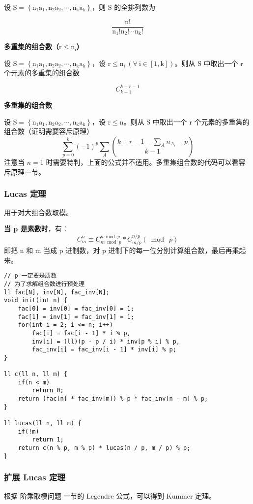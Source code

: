 \documentclass[UTF8]{article}
\begin{document}
设 $\mathrm{S = \left\{n_1a_1, n_2a_2, \cdots, n_ka_k\right\}}$，则 $\mathrm{S}$ 的全排列数为 

$$
\mathrm{\frac{n!}{n_1!n_2!\cdots n_k!}}
$$

\textbf{多重集的组合数（$\mathrm{r \le n_i}$）}

设 $\mathrm{S = \left\{ n_1a_1, n_2a_2, \cdots, n_ka_k \right\}}$，设 $\mathrm{r \le n_i \  (\forall \  i \in [1, k])}$。则从 $\mathrm{S}$ 中取出一个 $\mathrm{r}$ 个元素的多重集的组合数

$$
C^{k + r - 1}_{k - 1}
$$


\textbf{多重集的组合数}

设 $\mathrm{S = \left\{ n_1a_1, n_2a_2, \cdots, n_ka_k \right\}}$，设 $\mathrm{r \le n}$。则从 $\mathrm{S}$ 中取出一个 $\mathrm{r}$ 个元素的多重集的组合数（证明需要容斥原理）
$$
\sum_{p=0}^k(-1)^p \sum_A\binom{k+r-1-\sum_A n_{A_i}-p}{k-1}
$$
注意当 $n = 1$ 时需要特判，上面的公式并不适用。多重集组合数的代码可以看容斥原理一节。

\subsubsection{Lucas 定理}
用于对大组合数取模。

\textbf{当 p 是素数时}，有：
$$
C_m^n \equiv C_{m\bmod p}^{n\bmod p} * C_{m / p}^{n / p}(\bmod\ p)
$$
即把 $\mathrm{n}$ 和 $\mathrm{m}$ 当成 $\mathrm{p}$ 进制数，对 $\mathrm{p}$ 进制下的每一位分别计算组合数，最后再乘起来。
\begin{lstlisting}[caption=Lucas 定理]
// p 一定要是质数
// 为了求解组合数进行预处理
ll fac[N], inv[N], fac_inv[N];
void init(int n) {
    fac[0] = inv[0] = fac_inv[0] = 1;
    fac[1] = inv[1] = fac_inv[1] = 1;
    for(int i = 2; i <= n; i++)
        fac[i] = fac[i - 1] * i % p,
        inv[i] = (ll)(p - p / i) * inv[p % i] % p,
        fac_inv[i] = fac_inv[i - 1] * inv[i] % p;
}

ll c(ll n, ll m) {
    if(n < m)
        return 0;
    return (fac[n] * fac_inv[m]) % p * fac_inv[n - m] % p;
}

ll lucas(ll n, ll m) {
	if(!m)
		return 1;
	return c(n % p, m % p) * lucas(n / p, m / p) % p;
}

\end{lstlisting}


\subsubsection{扩展 Lucas 定理}
根据 阶乘取模问题 一节的 Legendre 公式，可以得到 Kummer 定理。
\end{document}

